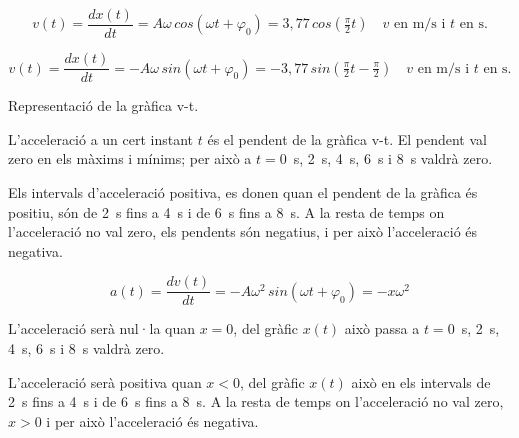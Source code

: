 \begin{solapartat}

 \[ v(t) = \frac{dx(t)}{dt} = A\omega\,cos(\omega t + \varphi_0) = 3,77\,cos\left(\tfrac{\pi}{2}t\right) \quad v \text{ en m/s i } t \text{ en s.} \]


 \[ v(t) = \frac{dx(t)}{dt} = -A\omega\,sin(\omega t + \varphi_0) = -3,77\,sin\left(\tfrac{\pi}{2}t - \tfrac{\pi}{2}\right) \quad v \text{ en m/s i } t \text{ en s.} \]

 Representació de la gràfica v-t.


 L'acceleració a un cert instant $t$ és el pendent de la gràfica v-t. El pendent val zero en els màxims i mínims; per això a $t=0$~s, 2~s, 4~s, 6~s i 8~s valdrà zero.

 Els intervals d'acceleració positiva, es donen quan el pendent de la gràfica és positiu, són de 2~s fins a 4~s i de 6~s fins a 8~s. A la resta de temps on l'acceleració no val zero, els pendents són negatius, i per això l'acceleració és negativa.


 \[ a(t) = \frac{dv(t)}{dt} = -A\omega^2\,sin(\omega t + \varphi_0) = -x\omega^2 \]

 L'acceleració serà nul·la quan $x = 0$, del gràfic $x(t)$ això passa a $t=0$~s, 2~s, 4~s, 6~s i 8~s valdrà zero.

 L'acceleració serà positiva quan $x < 0$, del gràfic $x(t)$ això en els intervals de 2~s fins a 4~s i de 6~s fins a 8~s. A la resta de temps on l'acceleració no val zero, $x > 0$ i per això l'acceleració és negativa.
\end{solapartat}
